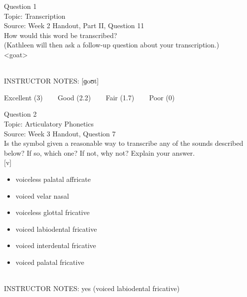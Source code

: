 \documentclass[12pt]{article}
\begin{document}
\begin{center}
\textbf{{\color{blue}{\HUGE START OF EXAM\\}}}

\textbf{{\color{blue}{\HUGE Student ID: 16464\\}}}

\textbf{{\color{blue}{\HUGE \\}}}

\end{center}
\newpage

{\large Question 1}\\

Topic: Transcription\\
Source: Week 2 Handout, Part II, Question 11\\

How would this word be transcribed?\\ (Kathleen will then ask a follow-up question about your transcription.)\\

<goat>


~\\
INSTRUCTOR NOTES: [ɡoʊt]


\vfill
Excellent (3) ~~~ Good (2.2) ~~~ Fair (1.7) ~~~ Poor (0)
\newpage

{\large Question 2}\\

Topic: Articulatory Phonetics\\
Source: Week 3 Handout, Question 7\\

Is the symbol given a reasonable way to transcribe any of the sounds described below? If so, which one? If not, why not? Explain your answer.\\

{[v]}

\begin{itemize} \item voiceless palatal affricate \item voiced velar nasal \item voiceless glottal fricative \item voiced labiodental fricative \item voiced interdental fricative \item voiced palatal fricative \end{itemize}


~\\
INSTRUCTOR NOTES: yes (voiced labiodental fricative)
\end{document}
